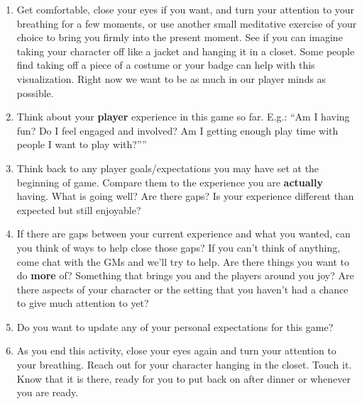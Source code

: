 \documentclass[green]{GL2020}
\begin{document}
\begin{enumerate}
	\item Get comfortable, close your eyes if you want, and turn your attention to your breathing for a few moments, or use another small meditative exercise of your choice to bring you firmly into the present moment. See if you can imagine taking your character off like a jacket and hanging it in a closet. Some people find taking off a piece of a costume or your badge can help with this visualization. Right now we want to be as much in our player minds as possible. 
	\item Think about your \textbf{player} experience in this game so far. E.g.: ``Am I having fun? Do I feel engaged and involved? Am I getting enough play time with people I want to play with?”''
	\item Think back to any player goals/expectations you may have set at the beginning of game. Compare them to the experience you are \textbf{actually} having. What is going well? Are there gaps? Is your experience different than expected but still enjoyable? 
	\item If there are gaps between your current experience and what you wanted, can you think of ways to help close those gaps? If you can’t think of anything, come chat with the GMs and we’ll try to help. Are there things you want to do \textbf{more} of? Something that brings you and the players around you joy? Are there aspects of your character or the setting that you haven’t had a chance to give much attention to yet?
	\item Do you want to update any of your personal expectations for this game?
	\item As you end this activity, close your eyes again and turn your attention to your breathing. Reach out for your character hanging in the closet. Touch it. Know that it is there, ready for you to put back on after dinner or whenever you are ready.
\end{enumerate}
\end{document}
